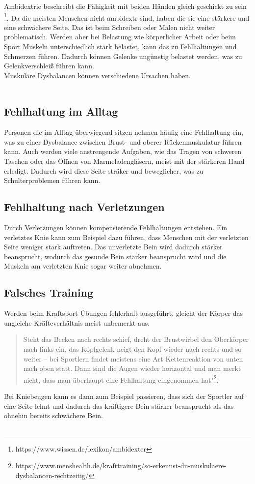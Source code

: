 
Ambidextrie beschreibt die Fähigkeit mit beiden Händen gleich geschickt zu sein \footnote{https://www.wissen.de/lexikon/ambidexter}. Da die meisten  Menschen nicht ambidextr sind, haben die sie eine stärkere und eine schwächere Seite. Das ist beim Schreiben oder Malen nicht weiter problematisch. Werden aber bei Belastung wie körperlicher Arbeit oder beim Sport Muskeln unterschiedlich stark belastet, kann das zu Fehlhaltungen und Schmerzen führen. Dadurch können Gelenke ungünstig belastet werden, was zu Gelenkverschleiß führen kann.\\
Muskuläre Dysbalancen können verschiedene Ursachen haben. \\
\\
 \subsection{Fehlhaltung im Alltag}
 Personen die im Alltag überwiegend sitzen nehmen häufig eine Fehlhaltung ein, was zu einer Dysbalance zwischen Brust- und oberer Rückenmuskulatur führen kann. Auch werden viele anstrengende Aufgaben, wie das Tragen von schweren Taschen oder das Öffnen von Marmeladengläsern, meist mit der stärkeren Hand erledigt. Dadurch wird diese Seite sträker und beweglicher, was zu Schulterproblemen führen kann.

 \subsection{Fehlhaltung nach Verletzungen}
 Durch Verletzungen können kompensierende Fehlhaltungen entstehen. Ein verletztes Knie kann zum Beispiel dazu führen, dass Menschen mit der verletzten Seite weniger stark auftreten. Das unverletzte Bein wird dadurch stärker beansprucht, wodurch das gesunde Bein stärker beansprucht wird und die Muskeln am verletzten Knie sogar weiter abnehmen.

 \subsection{Falsches Training}
Werden beim Kraftsport Übungen fehlerhaft ausgeführt, gleicht der Körper das ungleiche Kräfteverhältnis meist unbemerkt aus.

\begin{quote}
Steht das Becken nach rechts schief, dreht der Brustwirbel den Oberkörper nach links ein, das Kopfgelenk neigt den Kopf wieder nach rechts und so weiter – bei Sportlern findet meistens eine Art Kettenreaktion von unten nach oben statt. Dann sind die Augen wieder horizontal und man merkt nicht, dass man überhaupt eine Fehlhaltung eingenommen hat"\footnote{https://www.menshealth.de/krafttraining/so-erkennst-du-muskulaere-dysbalancen-rechtzeitig/}.
\end{quote}
Bei Kniebeugen kann es dann zum Beispiel passieren, dass sich der Sportler auf eine Seite lehnt und dadurch das kräftigere Bein stärker beansprucht als das ohnehin bereits schwächere Bein. \\
\\

